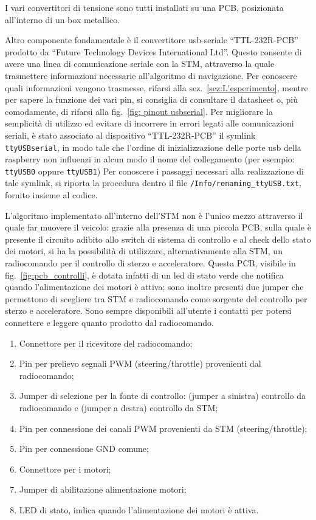 I vari convertitori di tensione sono tutti installati su una PCB, posizionata all’interno di un box metallico.

Altro componente fondamentale è il convertitore usb-seriale ``TTL-232R-PCB'' prodotto da 
``Future Technology Devices International Ltd''. 
Questo consente di avere una linea di comunicazione seriale con la STM, attraverso la quale trasmettere informazioni necessarie all'algoritmo di navigazione.
Per conoscere quali informazioni vengono trasmesse, rifarsi alla sez.~\ref{sez:L'esperimento}, mentre per sapere la funzione dei vari pin, si consiglia di 
consultare il datasheet o, più comodamente, di rifarsi alla fig.~\ref{fig: pinout usbserial}. 
Per migliorare la semplicità di utilizzo ed evitare di incorrere in errori legati alle comunicazioni seriali, è stato associato al dispositivo ``TTL-232R-PCB'' 
il symlink \texttt{ttyUSBserial}, in modo tale che l’ordine di inizializzazione delle porte usb della raspberry non influenzi in alcun modo il nome del collegamento 
(per esempio: \texttt{ttyUSB0} oppure  \texttt{ttyUSB1})
Per conoscere i passaggi necessari alla realizzazione di tale symlink, si riporta la procedura dentro il file \texttt{/Info/renaming\_ttyUSB.txt}, 
fornito insieme al codice.


L'algoritmo implementato all'interno dell'STM non è l'unico mezzo attraverso il quale far muovere il veicolo: grazie alla presenza di una piccola PCB, 
sulla quale è presente il circuito adibito allo switch di sistema di controllo e al check dello stato dei motori, si ha la possibilità di utilizzare, 
alternativamente alla STM, un radiocomando per il controllo di sterzo e acceleratore.
Questa PCB, visibile in fig.~\ref{fig:pcb_controlli}, è dotata infatti di un led di stato verde che notifica quando l’alimentazione dei motori è attiva; 
sono inoltre presenti due jumper che permettono di scegliere tra STM e radiocomando come sorgente del controllo per sterzo e acceleratore. 
Sono sempre disponibili all’utente i contatti per potersi connettere e leggere quanto prodotto dal radiocomando.

\begin{enumerate}
    \item Connettore per il ricevitore del radiocomando;
    \item Pin per prelievo segnali PWM (steering/throttle) provenienti dal radiocomando;
    \item Jumper di selezione per la fonte di controllo: (jumper a sinistra) controllo da radiocomando e (jumper a destra) controllo da STM;
	\item Pin per connessione dei canali PWM provenienti da STM (steering/throttle);
    \item Pin per connessione GND comune;
    \item Connettore per i motori;
    \item Jumper di abilitazione alimentazione motori;
    \item LED di stato, indica quando l'alimentazione dei motori è attiva.
\end{enumerate}

